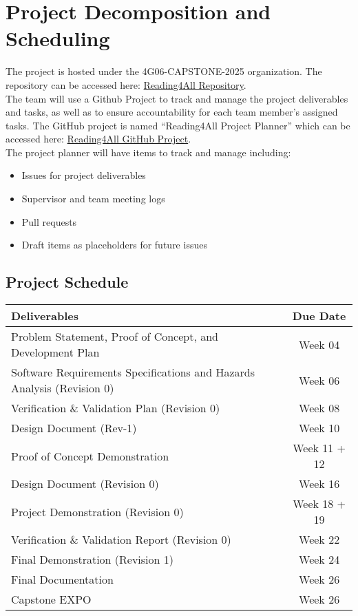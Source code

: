 \documentclass{article}
\begin{document}
\section{Project Decomposition and Scheduling}

The project is hosted under the 4G06-CAPSTONE-2025 organization. The repository can be 
accessed here: \href{https://github.com/4G06-CAPSTONE-2025/Reading4All}{Reading4All Repository}. \\[1ex]
The team will use a Github Project to track and manage the project deliverables and tasks, as well 
as to ensure accountability for each team member's assigned tasks. The GitHub 
project is named ``Reading4All Project Planner'' which can be accessed here: 
\href{https://github.com/orgs/4G06-CAPSTONE-2025/projects/4}{Reading4All GitHub Project}. \\[1ex]
The project planner will have items to track and manage including:
\begin{itemize}
  \item Issues for project deliverables
  \item Supervisor and team meeting logs 
  \item Pull requests 
  \item Draft items as placeholders for future issues
\end{itemize}
\subsection{Project Schedule}
\begin{center}
  \begin{tabularx}{\textwidth}{Xc}
    \toprule
    \textbf{Deliverables} & \textbf{Due Date} \\
    \midrule
    Problem Statement, Proof of Concept, and Development Plan & Week  04 \\
    Software Requirements Specifications and Hazards Analysis (Revision 0) & Week 06 \\
    Verification \& Validation Plan (Revision 0) & Week 08 \\
    Design Document (Rev-1) & Week 10 \\
    Proof of Concept Demonstration & Week 11 + 12 \\
    Design Document (Revision 0) & Week 16 \\
    Project Demonstration (Revision 0) & Week 18 + 19 \\
    Verification \& Validation Report (Revision 0) & Week 22 \\
    Final Demonstration (Revision 1) & Week 24 \\
    Final Documentation & Week 26 \\
    Capstone EXPO & Week 26 \\
    \bottomrule
  \end{tabularx}
\end{center}
\end{document}
